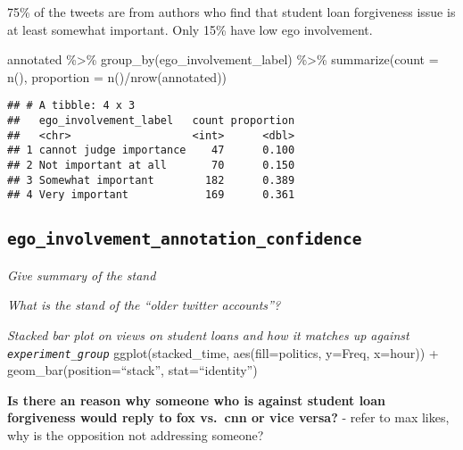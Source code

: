 \documentclass[
]{article}
\newenvironment{Shaded}{\begin{snugshade}}{\end{snugshade}}
\newcommand{\AttributeTok}[1]{\textcolor[rgb]{0.77,0.63,0.00}{#1}}
\newcommand{\FunctionTok}[1]{\textcolor[rgb]{0.00,0.00,0.00}{#1}}
\newcommand{\NormalTok}[1]{#1}
\newcommand{\SpecialCharTok}[1]{\textcolor[rgb]{0.00,0.00,0.00}{#1}}
\begin{document}
75\% of the tweets are from authors who find that student loan
forgiveness issue is at least somewhat important. Only 15\% have low ego
involvement.

\begin{Shaded}
\begin{Highlighting}[]
\NormalTok{annotated }\SpecialCharTok{\%\textgreater{}\%} \FunctionTok{group\_by}\NormalTok{(ego\_involvement\_label) }\SpecialCharTok{\%\textgreater{}\%} \FunctionTok{summarize}\NormalTok{(}\AttributeTok{count =} \FunctionTok{n}\NormalTok{(), }\AttributeTok{proportion =} \FunctionTok{n}\NormalTok{()}\SpecialCharTok{/}\FunctionTok{nrow}\NormalTok{(annotated))}
\end{Highlighting}
\end{Shaded}

\begin{verbatim}
## # A tibble: 4 x 3
##   ego_involvement_label   count proportion
##   <chr>                   <int>      <dbl>
## 1 cannot judge importance    47      0.100
## 2 Not important at all       70      0.150
## 3 Somewhat important        182      0.389
## 4 Very important            169      0.361
\end{verbatim}

\hypertarget{ego_involvement_annotation_confidence}{%
\subsection{\texorpdfstring{\texttt{ego\_involvement\_annotation\_confidence}}{ego\_involvement\_annotation\_confidence}}\label{ego_involvement_annotation_confidence}}

\emph{Give summary of the stand}

\emph{What is the stand of the ``older twitter accounts''?}

\emph{Stacked bar plot on views on student loans and how it matches up
against \texttt{experiment\_group}} ggplot(stacked\_time,
aes(fill=politics, y=Freq, x=hour)) + geom\_bar(position=``stack'',
stat=``identity'')

\textbf{Is there an reason why someone who is against student loan
forgiveness would reply to fox vs.~cnn or vice versa?} - refer to max
likes, why is the opposition not addressing someone?
\end{document}

